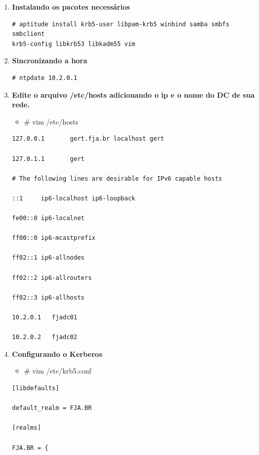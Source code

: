 \begin{enumerate}
	\item \textbf{Instalando os pacotes necessários}\\
\begin{lstlisting}
# aptitude install krb5-user libpam-krb5 winbind samba smbfs smbclient
krb5-config libkrb53 libkadm55 vim
\end{lstlisting}

	\item \textbf{Sincronizando a hora}\\

\begin{lstlisting}
# ntpdate 10.2.0.1
\end{lstlisting}


	\item \textbf{Edite o arquivo /etc/hosts adicionando o ip e o nome do DC de sua rede.}
	\begin{itemize}
			\item \# vim /etc/hosts\\
	\end{itemize}
		\begin{lstlisting}
127.0.0.1       gert.fja.br localhost gert

127.0.1.1       gert

# The following lines are desirable for IPv6 capable hosts

::1     ip6-localhost ip6-loopback

fe00::0 ip6-localnet

ff00::0 ip6-mcastprefix

ff02::1 ip6-allnodes

ff02::2 ip6-allrouters

ff02::3 ip6-allhosts

10.2.0.1   fjadc01

10.2.0.2   fjadc02

\end{lstlisting}

	\item \textbf{Configurando o Kerberos}
		\begin{itemize}
			\item {\# vim /etc/krb5.conf}\\
		\end{itemize}
		\begin{lstlisting}
[libdefaults]

default_realm = FJA.BR

[realms]

FJA.BR = {


\end{lstlisting}
\end{enumerate}
